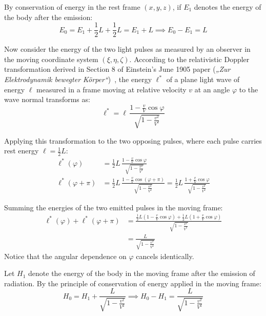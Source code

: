 \documentclass[11pt,a4paper]{article}
\begin{document}
By conservation of energy in the rest frame $(x, y, z)$, if $E_1$ denotes the energy of the body after the emission:
\begin{equation}
E_0 = E_1 + \frac{1}{2}L + \frac{1}{2}L = E_1 + L \implies E_0 - E_1 = L
\label{eq:rest_energy_diff}
\end{equation}

Now consider the energy of the two light pulses as measured by an observer in the moving coordinate system $(\xi, \eta, \zeta)$. According to the relativistic Doppler transformation derived in Section 8 of Einstein's June 1905 paper (\textit{„Zur Elektrodynamik bewegter Körper“})~\cite{Einstein1905a}, the energy $\ell^*$ of a plane light wave of energy $\ell$ measured in a frame moving at relative velocity $v$ at an angle $\varphi$ to the wave normal transforms as:
\begin{equation}
\ell^* = \ell \, \frac{1 - \frac{v}{V}\cos\varphi}{\sqrt{1 - \frac{v^2}{V^2}}}
\label{eq:doppler_transform}
\end{equation}

Applying this transformation to the two opposing pulses, where each pulse carries rest energy $\ell = \frac{1}{2}L$:
\begin{align}
\ell^*(\varphi) &= \frac{1}{2}L \, \frac{1 - \frac{v}{V}\cos\varphi}{\sqrt{1 - \frac{v^2}{V^2}}} \\
\ell^*(\varphi + \pi) &= \frac{1}{2}L \, \frac{1 - \frac{v}{V}\cos(\varphi + \pi)}{\sqrt{1 - \frac{v^2}{V^2}}} = \frac{1}{2}L \, \frac{1 + \frac{v}{V}\cos\varphi}{\sqrt{1 - \frac{v^2}{V^2}}}
\end{align}

Summing the energies of the two emitted pulses in the moving frame:
\begin{equation}
\begin{aligned} \ell^*(\varphi) + \ell^*(\varphi + \pi) &= \frac{\frac{1}{2}L\left(1 - \frac{v}{V}\cos\varphi\right) + \frac{1}{2}L\left(1 + \frac{v}{V}\cos\varphi\right)}{\sqrt{1 - \frac{v^2}{V^2}}} \\ &= \frac{L}{\sqrt{1 - \frac{v^2}{V^2}}} \end{aligned}
\label{eq:sum_pulses_moving}
\end{equation}
Notice that the angular dependence on $\varphi$ cancels identically.

Let $H_1$ denote the energy of the body in the moving frame after the emission of radiation. By the principle of conservation of energy applied in the moving frame:
\begin{equation}
H_0 = H_1 + \frac{L}{\sqrt{1 - \frac{v^2}{V^2}}} \implies H_0 - H_1 = \frac{L}{\sqrt{1 - \frac{v^2}{V^2}}}
\label{eq:moving_energy_diff}
\end{equation}
\end{document}
